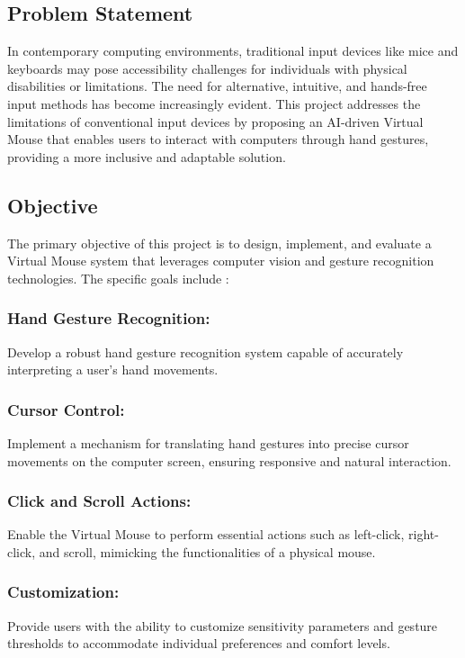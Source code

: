 \documentclass[12pt,a4paper]{report}
\begin{document}
	\subsection{Problem Statement }
	In contemporary computing environments, traditional input devices like mice and keyboards may pose accessibility challenges for individuals with physical disabilities or limitations. The need for alternative, intuitive, and hands-free input methods has become increasingly evident. This project addresses the limitations of conventional input devices by proposing an AI-driven Virtual Mouse that enables users to interact with computers through hand gestures, providing a more inclusive and adaptable solution. 
	\label{Objective}
	\subsection{Objective }
	The primary objective of this project is to design, implement, and evaluate a Virtual Mouse system that leverages computer vision and gesture recognition technologies. The specific goals include : 

 

\subsubsection{{Hand Gesture Recognition:}}Develop a robust hand gesture recognition system capable of accurately interpreting a user's hand movements. 


\subsubsection{{Cursor Control:}}Implement a mechanism for translating hand gestures into precise cursor movements on the computer screen, ensuring responsive and natural interaction. 


\subsubsection{{Click and Scroll Actions:}}Enable the Virtual Mouse to perform essential actions such as left-click, right-click, and scroll, mimicking the functionalities of a physical mouse. 


\subsubsection{{Customization:}}Provide users with the ability to customize sensitivity parameters and gesture thresholds to accommodate individual preferences and comfort levels. 
\end{document}
